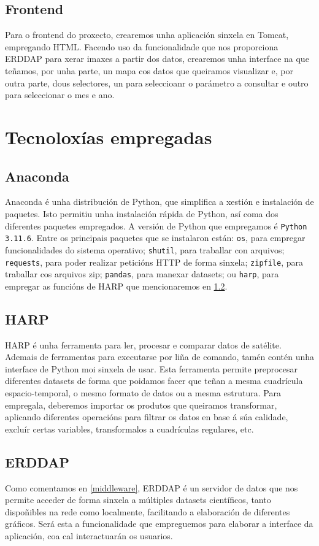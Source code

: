 \subsection{Frontend}\label{frontend}
Para o frontend do proxecto, crearemos unha aplicación sinxela en Tomcat, empregando HTML. Facendo uso da funcionalidade que nos proporciona \break ERDDAP para xerar imaxes a partir dos datos,
crearemos unha interface na que teñamos, por unha parte, un mapa cos datos que queiramos visualizar e, por outra parte, dous selectores, un para seleccioanr o parámetro a consultar e outro para
seleccionar o mes e ano.

\section{Tecnoloxías empregadas}\label{tecnoloxias}
\subsection{Anaconda}\label{anaconda}
Anaconda é unha distribución de Python, que simplifica a xestión e instalación de paquetes. Isto permitiu unha instalación rápida de Python, así coma dos diferentes paquetes empregados. A versión
de Python que empregamos é \texttt{Python 3.11.6}. Entre os principais paquetes que se instalaron están: \texttt{os}, para empregar funcionalidades do sistema operativo; \texttt{shutil}, para
traballar con arquivos; \texttt{requests}, para poder realizar peticións HTTP de forma sinxela; \texttt{zipfile}, para traballar cos arquivos zip; \texttt{pandas}, para manexar datasets; ou \texttt{harp},
para empregar as funcións de HARP que mencionaremos en \ref{harp}.

\subsection{HARP}\label{harp}
HARP é unha ferramenta para ler, procesar e comparar datos de satélite. Ademais de ferramentas para executarse por liña de comando, tamén contén unha interface de Python moi sinxela de usar. Esta
ferramenta permite preprocesar diferentes datasets de forma que poidamos facer que teñan a mesma cuadrícula espacio-temporal, o mesmo formato de datos ou a mesma estrutura. Para empregala,
deberemos importar os produtos que queiramos transformar, aplicando diferentes operacións para filtrar os datos en base á súa calidade, excluír certas variables, transformalos a cuadrículas
regulares, etc.

\subsection{ERDDAP}
Como comentamos en \ref{middleware}, ERDDAP é un servidor de datos que nos permite acceder de forma sinxela a múltiples datasets científicos, tanto dispoñibles na rede como localmente, facilitando
a elaboración de diferentes gráficos. Será esta a funcionalidade que empreguemos para elaborar a interface da aplicación, coa cal interactuarán os usuarios.


